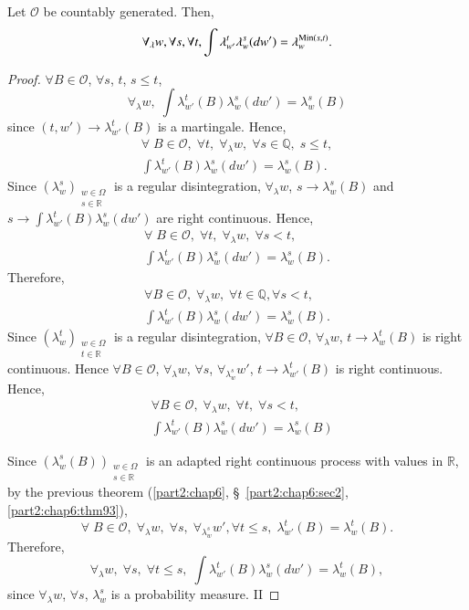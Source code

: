 \begin{thm}\label{part2:chap6:thm94}
Let $\mathscr{O}$ be countably generated. Then,
$$
\forall_\lambda w, \forall s , \forall t, \int \lambda^t_{w'}
\lambda^s_w(dw') = \lambda^{\operatorname{Min}(s,t)}_w.
$$
\end{thm}

\begin{proof}
$\forall B \in \mathscr{O}$, $\forall s$, $t$, $s \leq t$,
$$
\forall_\lambda w, \; \int \lambda^t_{w'} (B) \lambda^s_w(dw') =
\lambda^s_w(B) 
$$
since $(t,w') \to \lambda^t_{w'}(B)$ is a martingale. Hence, 
\begin{gather*}
\forall \; B\in \mathscr{O}, \; \forall t, \; \forall_\lambda w, \;
\forall s \in \mathbb{Q}, \;  s \leq t,\\
\int \lambda^{t}_{w'}(B) \lambda^s_w(dw') = \lambda^s_w(B).
\end{gather*}
Since $(\lambda^s_w)_{\substack{w \in \Omega\\s \in \mathbb{R}}}$ is a
regular disintegration, $\forall_\lambda w$, $s \to \lambda^s_w(B)$
and $s \to \int \lambda^t_{w'} (B) \lambda^s_w(dw')$ are right
continuous. Hence, 
\begin{gather*}
\forall \; B \in \mathscr{O}, \; \forall t, \; \forall_\lambda w, \;
\forall s < t,\\
\int \lambda^t_{w'} (B) \lambda^s_w (dw') = \lambda^s_w(B). 
\end{gather*}\pageoriginale 
Therefore, 
\begin{gather*}
\forall B \in \mathscr{O}, \; \forall_\lambda w, \; \forall t \in
\mathbb{Q}, \forall s < t,\\
\int \lambda^t_{w'} (B) \lambda^s_w(dw') = \lambda^s_w(B). 
\end{gather*}
Since $(\lambda^t_w)_{\substack{w \in \Omega\\ t \in \mathbb{R}}}$ is
a regular disintegration, $\forall B \in \mathscr{O}$,
$\forall_\lambda w$, $t \to \lambda^t_w(B)$ is right continuous. Hence
$\forall B \in \mathscr{O}$, $\forall_\lambda w$, $\forall s$,
$\forall_{\lambda^s_w} w'$, $t \to \lambda^t_{w'}(B)$ is right
continuous. Hence, 
\begin{align*}
& \forall B \in \mathscr{O}, \; \forall_\lambda w, \;  \forall t, \;
  \forall s < t, \\
& \int \lambda^t_{w'} (B) \lambda^s_w(dw') = \lambda^s_w(B) \tag{1}
\end{align*}

Since $(\lambda^s_w(B))_{\substack{w\in \Omega\\s \in \mathbb{R} }}$
is an adapted right continuous process with values in $\mathbb{R}$, by
the previous theorem (\ref{part2:chap6}, \S\ \ref{part2:chap6:sec2},
\ref{part2:chap6:thm93}),  
$$
\forall \; B \in \mathscr{O}, \; \forall_\lambda w, \; \forall s, \;
\forall_{\lambda^s_w} w', \forall t \leq s ,\; \lambda^t_{w'} (B) =
\lambda^t_w(B) . 
$$
Therefore, 
$$
\forall_\lambda w, \; \forall s, \; \forall t \leq s, \; \int
\lambda^t_{w'} (B) \lambda^s_w(dw') = \lambda^t_w(B),
$$
since $\forall_\lambda w$, $\forall s$, $\lambda^s_w$ is a probability
measure. \hfill{II}


\end{proof}
